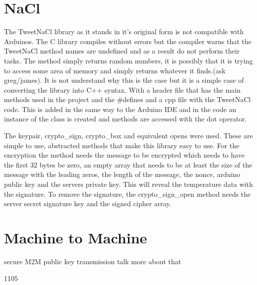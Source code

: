 \section{NaCl}

The TweetNaCl library as it stands in it's original form is not compatible with Arduinos. The C library compiles without errors but the compiler warns that the TweetNaCl method names are undefined and as a result do not perform their tasks. The method simply returns random numbers, it is possibly that it is trying to access some area of memory and simply returns whatever it finds.(ask greg/james). It is not understand why this is the case but it is a simple case of converting the library into C++ syntax. With a header file that has the main methods used in the project and the \#defines and a cpp file with the TweetNaCl code. This is added in the same way to the Arduino IDE and in the code an instance of the class is created and methods are accessed with the dot operator.

The keypair, crypto\_sign, crypto\_box and equivalent opens were used. These are simple to use, abstracted methods that make this library easy to use. For the encryption the method needs the message to be encrypted which needs to have the first 32 bytes be zero, an empty array that needs to be at least the size of the message with the leading zeros, the length of the message, the nonce, arduino public key and the servers private key. This will reveal the temperature data with the signature. To remove the signature, the crypto\_sign\_open method needs the server secret signature key and the signed cipher array.

\section{Machine to Machine}


secure M2M public key transmission
talk more about that


1105